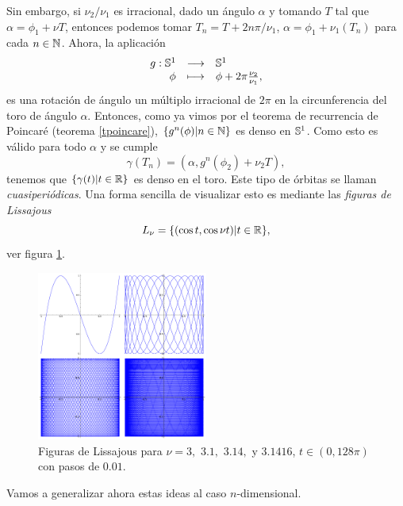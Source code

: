   Sin embargo, si $\nu_2/\nu_1$ es irracional, dado un ángulo $\alpha$ y tomando $T$ tal que $\alpha=\phi_1+\nu T$, entonces podemos tomar $T_n=T+2n\pi/\nu_1$, $\alpha=\phi_1+\nu_1(T_n)$ para cada $n\in \mathbb{N}$. Ahora, la aplicación
  \begin{equation*}
    \begin{array}{rcl}
    g:\mathbb{S}^1 & \longrightarrow &\mathbb{S}^1 \\
  \phi & \longmapsto & \phi + 2\pi\frac{\nu_2}{\nu_1},
  \end{array}
\end{equation*}
es una rotación de ángulo un múltiplo irracional de $2\pi$ en la circunferencia del toro de ángulo $\alpha$. Entonces, como ya vimos por el teorema de recurrencia de Poincaré (teorema \ref{tpoincare}), $\{g^n(\phi)|n\in \mathbb{N}\}$ es denso en $\mathbb{S}^1$. Como esto es válido para todo $\alpha$ y se cumple 
\begin{equation*}
  \gamma(T_n)=(\alpha,g^n(\phi_2)+\nu_2 T),
\end{equation*}
tenemos que $\{\gamma(t)|t \in \mathbb{R} \}$ es denso en el toro. Este tipo de órbitas se llaman \emph{cuasiperiódicas}. Una forma sencilla de visualizar esto es mediante las \emph{figuras de Lissajous} 
\begin{equation*}
  L_{\nu}=\{(\cos t, \cos \nu t) | t \in \mathbb{R}\},
\end{equation*}
ver figura \ref{fig:lissajous}.
\begin{figure}[h!]
  \centering
  \includegraphics[width=0.5\textwidth]{pics/lissajous}
  \caption{\small Figuras de Lissajous para $\nu=3,$ $3.1,$ $3.14,$  y $3.1416$, $t \in (0,128\pi)$ con pasos de $0.01$.}
  \label{fig:lissajous}
\end{figure}

Vamos a generalizar ahora estas ideas al caso $n$-dimensional.

